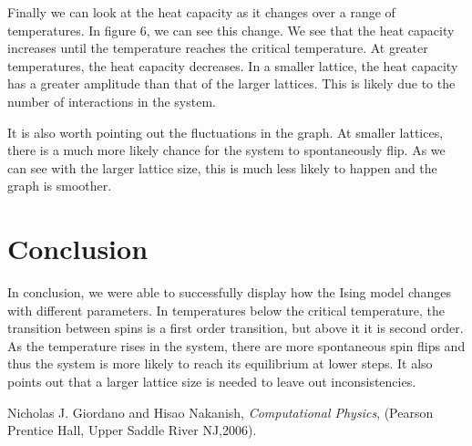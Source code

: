 \documentclass[pra,twocolumn,showpacs,amsmath,amssymb]{revtex4-2}
\begin{document}
Finally we can look at the heat capacity as it changes over a range of temperatures. In figure 6, we can see this change. We see that the heat capacity increases until the temperature reaches the critical temperature. At greater temperatures, the heat capacity decreases. In a smaller lattice, the heat capacity has a greater amplitude than that of the larger lattices. This is likely due to the number of interactions in the system.
\par It is also worth pointing out the fluctuations in the graph. At smaller lattices, there is a much more likely chance for the system to spontaneously flip. As we can see with the larger lattice size, this is much less likely to happen and the graph is smoother.

\section{Conclusion} \label{sec:conclusion}

In conclusion, we were able to successfully display how the Ising model changes with different parameters. In temperatures below the critical temperature, the transition between spins is a first order transition, but above it it is second order. As the temperature rises in the system, there are more spontaneous spin flips and thus the system is more likely to reach its equilibrium at lower steps. It also points out that a larger lattice size is needed to leave out inconsistencies. 

\begin{thebibliography}{9}
\bibitem{}Nicholas J. Giordano and Hisao Nakanish, \emph{Computational Physics}, (Pearson Prentice Hall, Upper Saddle River NJ,2006).
\end{thebibliography}
\end{document}
